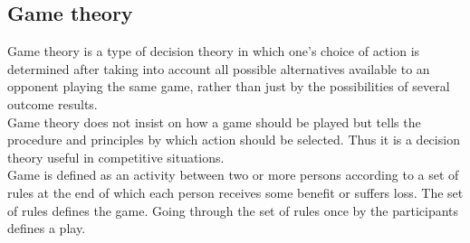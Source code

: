 \begin{figure}[H]
    \centering
    \begin{minipage}{0.45\textwidth}
        \centering
        \caption{}
        \label{fig:match_1}
    \end{minipage}
    \hfill
    \begin{minipage}{0.45\textwidth}
        \centering
        \caption{}
        \label{fig:match_2}
    \end{minipage}
\end{figure}


\subsection{Game theory}
Game theory is a type of decision theory in which one’s choice of action is determined after taking
into account all possible alternatives available to an opponent playing the same game, rather than just
by the possibilities of several outcome results. \\
Game theory does not insist on how a game should be played but tells the procedure and principles by which action should be selected.
Thus it is a decision theory useful in competitive situations. \\
Game is defined as an activity between two or more persons according to a set of rules at the end of
which each person receives some benefit or suffers loss. The set of rules defines the game.
Going through the set of rules once by the participants defines a play.
\\

